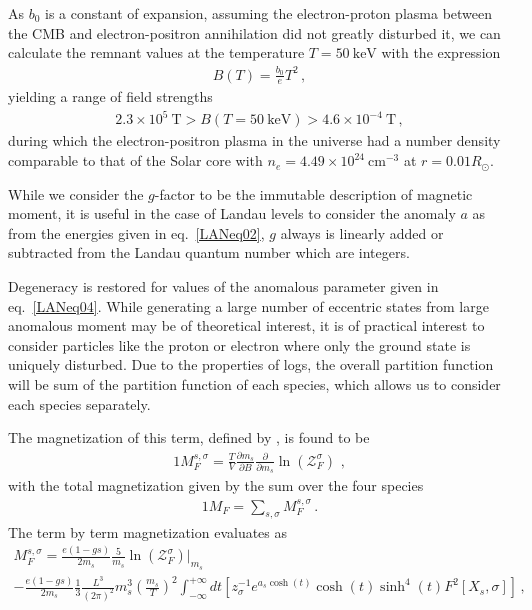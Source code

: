 As $b_0$ is a constant of expansion, assuming the electron-proton plasma between the CMB and electron-positron annihilation did not greatly disturbed it, we can calculate the remnant values at the temperature $T=50\ \mathrm{keV}$ with the expression
\begin{align}
  \label{BBNFields} B(T)=\frac{b_{0}}{e}T^{2}\,,
\end{align}
yielding a range of field strengths
\begin{align}
  \label{BBNRange} 2.3\times10^{5}\ \mathrm{T}>B(T=50\ \mathrm{keV})>4.6\times10^{-4}\ \mathrm{T}\,,
\end{align}
during which the electron-positron plasma in the universe had a number density comparable to that of the Solar core with $n_{e}=4.49\times10^{24}\ \mathrm{cm}^{-3}$ at $r=0.01R_{\odot}$.

While we consider the $g$-factor to be the immutable description of magnetic moment, it is useful in the case of Landau levels to consider the anomaly $a$ as from the energies given in eq.~\eqref{LANeq02}, $g$ always is linearly added or subtracted from the Landau quantum number which are integers.

Degeneracy is restored for values of the anomalous parameter given in eq.~\eqref{LANeq04}. While generating a large number of eccentric states from large anomalous moment may be of theoretical interest, it is of practical interest to consider particles like the proton or electron where only the ground state is uniquely disturbed. Due to the properties of logs, the overall partition function will be sum of the partition function of each species, which allows us to consider each species separately.

The magnetization of this term, defined by , is found to be
\begin{alignat}{1}
    \label{FreelikeMag} M_{F}^{s,\sigma}=\frac{T}{V}\frac{\partial m_{s}}{\partial B}\frac{\partial}{\partial m_{s}}\ln(\mathcal{Z}_{F}^{\sigma})\,\,,
\end{alignat}
with the total magnetization given by the sum over the four species
\begin{alignat}{1}
    \label{TotalFreeMag} M_{F}=\sum_{s,\sigma}M_{F}^{s,\sigma}\,.
\end{alignat}
The term by term magnetization evaluates as
\begin{multline}
  \label{MagExplicit} M_{F}^{s,\sigma} = \frac{e(1-gs)}{2m_{s}}\frac{5}{m_{s}}\ln\left(\mathcal{Z}^{\sigma}_{F}\right)|_{m_{s}}\\
  -\frac{e(1-gs)}{2m_{s}}\frac{1}{3}\frac{L^{3}}{(2\pi)^{2}}m_{s}^{3}\left(\frac{m_{s}}{T}\right)^{2}
  \int_{-\infty}^{+\infty}dt\left[z_{\sigma}^{-1}e^{a_{s}\cosh(t)}\cosh(t)\sinh^{4}(t)F^{2}\left[X_{s},\sigma\right]\right]\,,
\end{multline}












